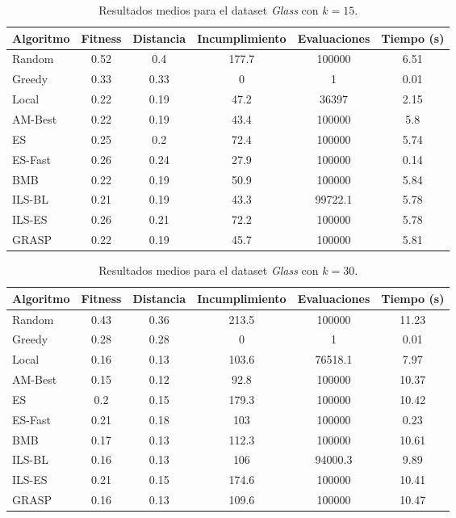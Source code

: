 \documentclass[a4paper,12pt]{article}%
\begin{document}
\begin{table}[H]
	\centering
	\begin{tabular}{|l|ccccc|}
		\hline
		Algoritmo & Fitness & Distancia & Incumplimiento & Evaluaciones & Tiempo (s) \\
		\hline
		Random   & 0.52 & 0.4  & 177.7 & 100000 & 6.51 \\
		Greedy   & 0.33 & 0.33 & 0     & 1      & 0.01 \\
		Local    & 0.22 & 0.19 & 47.2  & 36397  & 2.15 \\
		AM-Best  & 0.22 & 0.19 & 43.4  & 100000 & 5.8 \\
		ES       & 0.25 & 0.2  & 72.4  & 100000 & 5.74 \\
		ES-Fast  & 0.26 & 0.24 & 27.9  & 100000 & 0.14 \\
		BMB      & 0.22 & 0.19 & 50.9  & 100000 & 5.84 \\
		ILS-BL   & 0.21 & 0.19 & 43.3  & 99722.1 & 5.78 \\
		ILS-ES   & 0.26 & 0.21 & 72.2  & 100000 & 5.78 \\
		GRASP    & 0.22 & 0.19 & 45.7  & 100000 & 5.81 \\
		\hline
	\end{tabular}
	\caption{Resultados medios para el dataset \textit{Glass} con $k=15$.}
	\label{tab_glass15}
\end{table}

\begin{table}[H]
	\centering
	\begin{tabular}{|l|ccccc|}
		\hline
		Algoritmo & Fitness & Distancia & Incumplimiento & Evaluaciones & Tiempo (s) \\
		\hline
		Random   & 0.43 & 0.36 & 213.5 & 100000 & 11.23 \\
		Greedy   & 0.28 & 0.28 & 0     & 1      & 0.01 \\
		Local    & 0.16 & 0.13 & 103.6 & 76518.1 & 7.97 \\
		AM-Best  & 0.15 & 0.12 & 92.8  & 100000 & 10.37 \\
		ES       & 0.2  & 0.15 & 179.3 & 100000 & 10.42 \\
		ES-Fast  & 0.21 & 0.18 & 103   & 100000 & 0.23 \\
		BMB      & 0.17 & 0.13 & 112.3 & 100000 & 10.61 \\
		ILS-BL   & 0.16 & 0.13 & 106   & 94000.3 & 9.89 \\
		ILS-ES   & 0.21 & 0.15 & 174.6 & 100000 & 10.41 \\
		GRASP    & 0.16 & 0.13 & 109.6 & 100000 & 10.47 \\
		\hline
	\end{tabular}
	\caption{Resultados medios para el dataset \textit{Glass} con $k=30$.}
	\label{tab_glass30}
\end{table}
\end{document}
